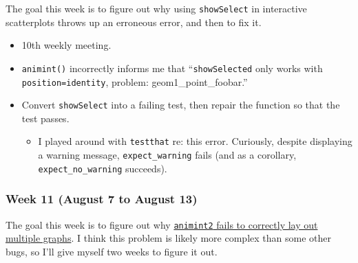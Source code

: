 \documentclass[
]{article}
\providecommand{\tightlist}{%
  \setlength{\itemsep}{0pt}\setlength{\parskip}{0pt}}\usepackage{longtable,booktabs,array}
\begin{document}
The goal this week is to figure out why using \texttt{showSelect} in
interactive scatterplots throws up an erroneous error, and then to fix
it.

\begin{itemize}
\item
  10th weekly meeting.
\item
  \texttt{animint()} incorrectly informs me that ``\texttt{showSelected}
  only works with \texttt{position=identity}, problem:
  geom1\_point\_foobar.''
\item
  Convert \texttt{showSelect} into a failing test, then repair the
  function so that the test passes.

  \begin{itemize}
  \tightlist
  \item
    I played around with \texttt{testthat} re: this error. Curiously,
    despite displaying a warning message, \texttt{expect\_warning} fails
    (and as a corollary, \texttt{expect\_no\_warning}
    succeeds).
  \end{itemize}
\end{itemize}

\hypertarget{week-11-august-7-to-august-13}{%
\subsubsection{Week 11 (August 7 to August
13)}\label{week-11-august-7-to-august-13}}

The goal this week is to figure out why
\href{https://github.com/tdhock/animint/issues/150}{\texttt{animint2}
fails to correctly lay out multiple graphs}. I think this problem is
likely more complex than some other bugs, so I'll give myself two weeks
to figure it out.
\end{document}
